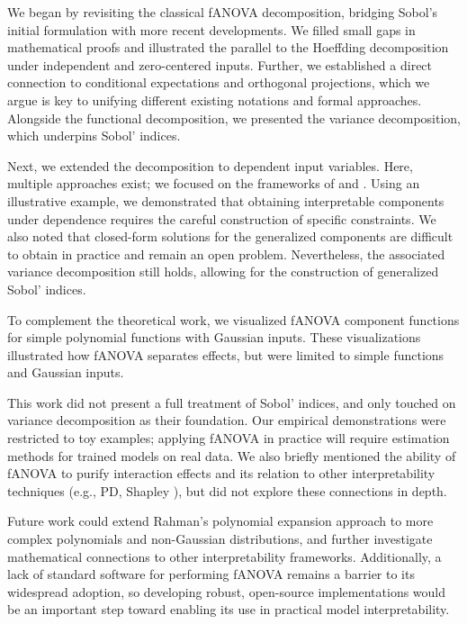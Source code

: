 We began by revisiting the classical fANOVA decomposition, bridging Sobol's initial formulation with more recent developments. We filled small gaps in mathematical proofs and illustrated the parallel to the Hoeffding decomposition under independent and zero-centered inputs. Further, we established a direct connection to conditional expectations and orthogonal projections, which we argue is key to unifying different existing notations and formal approaches. Alongside the functional decomposition, we presented the variance decomposition, which underpins Sobol' indices.\par

Next, we extended the decomposition to dependent input variables. Here, multiple approaches exist; we focused on the frameworks of \cite{hooker2007} and \cite{rahman2014}.
Using an illustrative example, we demonstrated that obtaining interpretable components under dependence requires the careful construction of specific constraints. We also noted that closed-form solutions for the generalized components are difficult to obtain in practice and remain an open problem. Nevertheless, the associated variance decomposition still holds, allowing for the construction of generalized Sobol' indices.\par

To complement the theoretical work, we visualized fANOVA component functions for simple polynomial functions with Gaussian inputs. These visualizations illustrated how fANOVA separates effects, but were limited to simple functions and Gaussian inputs.\par

This work did not present a full treatment of Sobol' indices, and only touched on variance decomposition as their foundation. Our empirical demonstrations were restricted to toy examples; applying fANOVA in practice will require estimation methods for trained models on real data. We also briefly mentioned the ability of fANOVA to purify interaction effects \citep{lengerich2020} and its relation to other interpretability techniques (e.g., PD, Shapley \citep{fumagalli2025}), but did not explore these connections in depth.\par

Future work could extend Rahman’s polynomial expansion approach to more complex polynomials and non-Gaussian distributions, and further investigate mathematical connections to other interpretability frameworks.
Additionally, a lack of standard software for performing fANOVA remains a barrier to its widespread adoption, so developing robust, open-source implementations would be an important step toward enabling its use in practical model interpretability.

